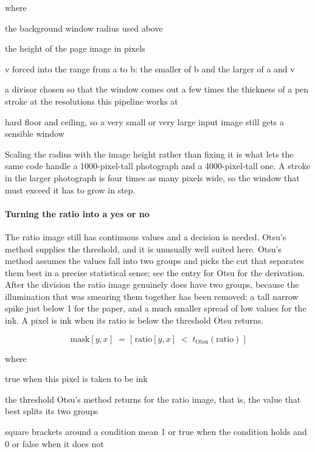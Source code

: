 \noindent where
\begin{description}[leftmargin=2.4em,style=nextline,font=\normalfont\ttfamily]\setlength\itemsep{1pt}
  \item[{$r$}] \normalfont the background window radius used above
  \item[{$H$}] \normalfont the height of the page image in pixels
  \item[{$\mathrm{clip}(v,a,b)$}] \normalfont v forced into the range from a to b: the smaller of b and the larger of a and v
  \item[{$41$}] \normalfont a divisor chosen so that the window comes out a few times the thickness of a pen stroke at the resolutions this pipeline works at
  \item[{$8,\;40$}] \normalfont hard floor and ceiling, so a very small or very large input image still gets a sensible window
\end{description}
Scaling the radius with the image height rather than fixing it is what lets the same code handle a 1000-pixel-tall photograph and a 4000-pixel-tall one. A stroke in the larger photograph is four times as many pixels wide, so the window that must exceed it has to grow in step.


\paragraph{Turning the ratio into a yes or no}
The ratio image still has continuous values and a decision is needed. Otsu's method supplies the threshold, and it is unusually well suited here. Otsu's method assumes the values fall into two groups and picks the cut that separates them best in a precise statistical sense; see the entry for Otsu for the derivation. After the division the ratio image genuinely does have two groups, because the illumination that was smearing them together has been removed: a tall narrow spike just below 1 for the paper, and a much smaller spread of low values for the ink. A pixel is ink when its ratio is below the threshold Otsu returns.


\begin{equation}
\mathrm{mask}[y,x] \;=\; \big[\;\mathrm{ratio}[y,x] \;<\; t_{\mathrm{Otsu}}(\mathrm{ratio})\;\big]
\end{equation}

\noindent where
\begin{description}[leftmargin=2.4em,style=nextline,font=\normalfont\ttfamily]\setlength\itemsep{1pt}
  \item[{$\mathrm{mask}[y,x]$}] \normalfont true when this pixel is taken to be ink
  \item[{$t_{\mathrm{Otsu}}(\mathrm{ratio})$}] \normalfont the threshold Otsu's method returns for the ratio image, that is, the value that best splits its two groups
  \item[{$[\;\cdot\;]$}] \normalfont square brackets around a condition mean 1 or true when the condition holds and 0 or false when it does not
\end{description}

